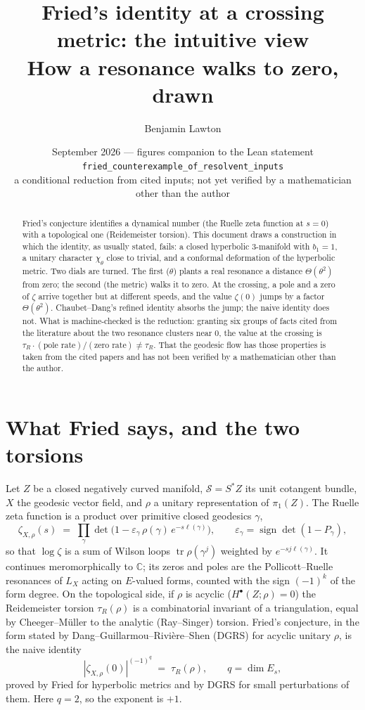 \documentclass[11pt]{article}
\title{Fried's identity at a crossing metric: the intuitive view\\
\large How a resonance walks to zero, drawn}
\author{Benjamin Lawton}
\date{September 2026 --- figures companion to the Lean statement
\texttt{fried\_counterexample\_of\_resolvent\_inputs}\\[2pt]
\small a conditional reduction from cited inputs; not yet verified by a mathematician other than the author}
\begin{document}
\maketitle

\begin{abstract}
\noindent Fried's conjecture identifies a dynamical number (the Ruelle zeta function at $s=0$)
with a topological one (Reidemeister torsion). This document draws a construction in which the
identity, as usually stated, fails: a closed hyperbolic 3-manifold with $b_1 = 1$, a unitary
character $\chi_\theta$ close to trivial, and a conformal deformation of the hyperbolic metric.
Two dials are turned. The first ($\theta$) plants a real resonance a distance $\Theta(\theta^2)$
from zero; the second (the metric) walks it to zero. At the crossing, a pole and a zero of
$\zeta$ arrive together but at different speeds, and the value $\zeta(0)$ jumps by a factor
$\Theta(\theta^2)$. Chaubet--Dang's refined identity absorbs the jump; the naive identity does
not. What is machine-checked is the reduction: granting six groups of facts cited from the
literature about the two resonance clusters near $0$, the value at the crossing is
$\tau_R \cdot (\text{pole rate})/(\text{zero rate}) \neq \tau_R$. That the geodesic flow has
those properties is taken from the cited papers and has not been verified by a mathematician
other than the author.
\end{abstract}

\section{What Fried says, and the two torsions}

Let $Z$ be a closed negatively curved manifold, $\mathcal{S} = S^*Z$ its unit cotangent bundle,
$X$ the geodesic vector field, and $\rho$ a unitary representation of $\pi_1(Z)$. The Ruelle
zeta function is a product over primitive closed geodesics $\gamma$,
\[
\zeta_{X,\rho}(s) \;=\; \prod_{\gamma} \det\!\big(1 - \varepsilon_\gamma\, \rho(\gamma)\, e^{-s\ell(\gamma)}\big),
\qquad \varepsilon_\gamma = \operatorname{sign}\det(1 - P_\gamma),
\]
so that $\log \zeta$ is a sum of Wilson loops $\operatorname{tr}\rho(\gamma^j)$ weighted by
$e^{-sj\ell(\gamma)}$. It continues meromorphically to $\mathbb{C}$; its zeros and poles are the
Pollicott--Ruelle resonances of $L_X$ acting on $E$-valued forms, counted with the sign
$(-1)^k$ of the form degree. On the topological side, if $\rho$ is acyclic ($H^\bullet(Z;\rho)=0$)
the Reidemeister torsion $\tau_R(\rho)$ is a combinatorial invariant of a triangulation, equal by
Cheeger--M\"uller to the analytic (Ray--Singer) torsion. Fried's conjecture, in the form stated
by Dang--Guillarmou--Rivi\`ere--Shen (DGRS) for acyclic unitary $\rho$, is the naive identity
\[
|\zeta_{X,\rho}(0)|^{(-1)^q} \;=\; \tau_R(\rho), \qquad q = \dim E_s ,
\]
proved by Fried for hyperbolic metrics and by DGRS for small perturbations of them. Here $q = 2$,
so the exponent is $+1$.
\end{document}
